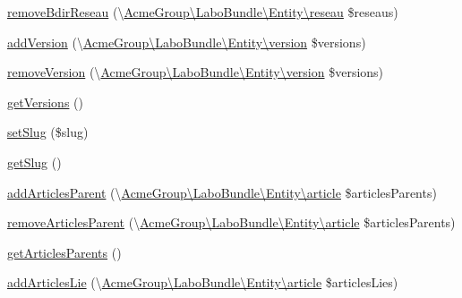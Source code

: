 \begin{DoxyCompactItemize}
\item 
\hyperlink{class_acme_group_1_1_labo_bundle_1_1_entity_1_1article_a08cb09f653e80ece5f5ea7186fda7e72}{remove\+Bdir\+Reseau} (\textbackslash{}\hyperlink{class_acme_group_1_1_labo_bundle_1_1_entity_1_1reseau}{Acme\+Group\textbackslash{}\+Labo\+Bundle\textbackslash{}\+Entity\textbackslash{}reseau} \$reseaus)
\item 
\hyperlink{class_acme_group_1_1_labo_bundle_1_1_entity_1_1article_a6eea881a44b66492eab4ce8b1e1a6d8f}{add\+Version} (\textbackslash{}\hyperlink{class_acme_group_1_1_labo_bundle_1_1_entity_1_1version}{Acme\+Group\textbackslash{}\+Labo\+Bundle\textbackslash{}\+Entity\textbackslash{}version} \$versions)
\item 
\hyperlink{class_acme_group_1_1_labo_bundle_1_1_entity_1_1article_ae3e45ec68c0e7ee120bcbe9cff336367}{remove\+Version} (\textbackslash{}\hyperlink{class_acme_group_1_1_labo_bundle_1_1_entity_1_1version}{Acme\+Group\textbackslash{}\+Labo\+Bundle\textbackslash{}\+Entity\textbackslash{}version} \$versions)
\item 
\hyperlink{class_acme_group_1_1_labo_bundle_1_1_entity_1_1article_ae3f0786b9b7e50275e586c4b999c0270}{get\+Versions} ()
\item 
\hyperlink{class_acme_group_1_1_labo_bundle_1_1_entity_1_1article_a8caaf4076f245cbb570fc69d6872f001}{set\+Slug} (\$slug)
\item 
\hyperlink{class_acme_group_1_1_labo_bundle_1_1_entity_1_1article_a858bb843ca8a52e642bcb3eb1f2eca3f}{get\+Slug} ()
\item 
\hyperlink{class_acme_group_1_1_labo_bundle_1_1_entity_1_1article_a8d695af2ec61ce360e81768b658a5514}{add\+Articles\+Parent} (\textbackslash{}\hyperlink{class_acme_group_1_1_labo_bundle_1_1_entity_1_1article}{Acme\+Group\textbackslash{}\+Labo\+Bundle\textbackslash{}\+Entity\textbackslash{}article} \$articles\+Parents)
\item 
\hyperlink{class_acme_group_1_1_labo_bundle_1_1_entity_1_1article_a51e619110f09d1f04cb91734e4f55296}{remove\+Articles\+Parent} (\textbackslash{}\hyperlink{class_acme_group_1_1_labo_bundle_1_1_entity_1_1article}{Acme\+Group\textbackslash{}\+Labo\+Bundle\textbackslash{}\+Entity\textbackslash{}article} \$articles\+Parents)
\item 
\hyperlink{class_acme_group_1_1_labo_bundle_1_1_entity_1_1article_a503b37a948aaa1211d3839062b4a35e0}{get\+Articles\+Parents} ()
\item 
\hyperlink{class_acme_group_1_1_labo_bundle_1_1_entity_1_1article_a58f6c4e820d3768f30e0ebea579023b8}{add\+Articles\+Lie} (\textbackslash{}\hyperlink{class_acme_group_1_1_labo_bundle_1_1_entity_1_1article}{Acme\+Group\textbackslash{}\+Labo\+Bundle\textbackslash{}\+Entity\textbackslash{}article} \$articles\+Lies)

\end{DoxyCompactItemize}
